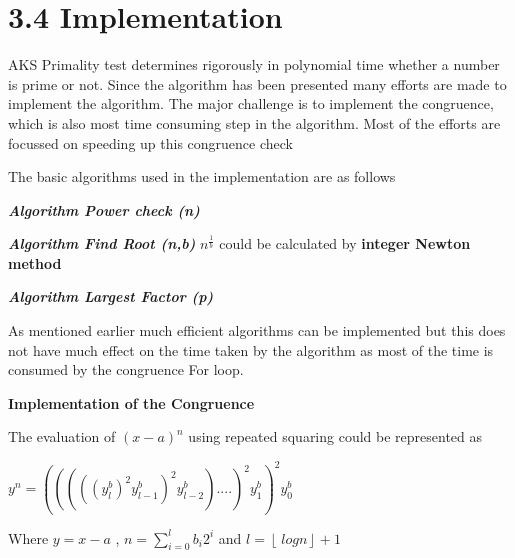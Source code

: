 \documentclass[a4paper,12pt]{article}
\begin{document}
\section*{\large 3.4 Implementation}
\vspace{0.1in}

AKS Primality test determines rigorously in polynomial time whether a number
is prime or not. Since the algorithm has been presented many efforts are made to
implement the algorithm. The major challenge is to implement the congruence, which is also most time consuming step in the algorithm. Most of the efforts are focussed on speeding up this congruence check

\begin{flushleft}
	The basic algorithms used in the implementation are as follows
\end{flushleft}
\begin{flushleft}
	\textbf{\textit{Algorithm Power check (n)}}
\end{flushleft}

\begin{flushleft}
	\textbf{\textit{Algorithm Find Root (n,b)}}
	\(n^{\frac{1}{b}}\) could be calculated by \textbf{integer Newton method}
\end{flushleft}

\begin{flushleft}
	\textbf{\textit{Algorithm Largest Factor (p)}}
\end{flushleft}

As mentioned earlier much efficient algorithms can be implemented but this does not have much effect on the time taken by the algorithm as most of the time is consumed by the congruence For loop.

\begin{flushleft}
	\textbf{Implementation of the Congruence}
\end{flushleft}

\begin{flushleft}
	The evaluation of \((x-a)^n\) using repeated squaring could be represented as
\end{flushleft}

\begin{center}
	\(y^n = (((((y^b_{l})^2y^b_{l-1})^2y^b_{l-2})....)^2y^b_{1})^2y^b_{0}\)
\end{center}

\begin{center}
	Where \(y=x-a\) , \(n=\sum_{i=0}^{l}b_{i}2^i\) and \(l = \left\lfloor\ logn \right\rfloor +1 \)
\end{center}
\end{document}
